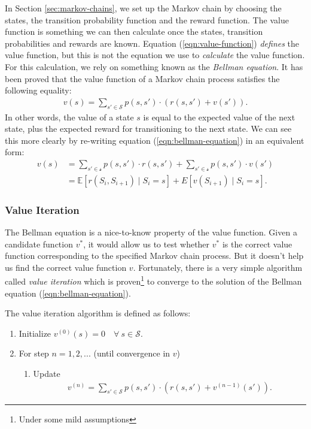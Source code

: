 \documentclass{article}
\begin{document}
      In Section \ref{sec:markov-chains}, we set up the Markov chain by choosing the states, the transition probability function and the reward function. The value function is something we can then calculate once the states, transition probabilities and rewards are known. Equation (\ref{eqn:value-function}) {\it defines} the value function, but this is not the equation we use to {\it calculate} the value function. For this calculation, we rely on something known as the {\it Bellman equation}. It has been proved that the value function of a Markov chain process satisfies the following equality:
      \begin{align}
        \label{eqn:bellman-equation}
        v(s) = \sum_{s' \in \mathcal S} p(s, s') \cdot (r(s, s') + v(s')).
      \end{align}
      In other words, the value of a state $s$ is equal to the expected value of the next state, plus the expected reward for transitioning to the next state. We can see this more clearly by re-writing equation (\ref{eqn:bellman-equation}) in an equivalent form:
      \begin{align*}
        v(s) &= \sum_{s' \in \mathcal s} p(s, s') \cdot r(s, s') + \sum_{s' \in \mathcal s} p(s, s') \cdot v(s')\\
        &= \mathbb E[r(S_i, S_{i+1}) \mid S_i = s] + E[v(S_{i+1}) \mid S_i = s].
      \end{align*}

    \subsubsection{\sc Value Iteration}

      The Bellman equation is a nice-to-know property of the value function. Given a candidate function $v^*$, it would allow us to test whether $v^*$ is the correct value function corresponding to the specified Markov chain process. But it doesn't help us find the correct value function $v$. Fortunately, there is a very simple algorithm called {\it value iteration} which is proven\footnote{Under some mild assumptions} to converge to the solution of the Bellman equation (\ref{eqn:bellman-equation}).

      The value iteration algorithm is defined as follows:
      \begin{enumerate}
        \item Initialize $v^{(0)}(s) = 0 \quad \forall~s\in\mathcal S$.
        \item For step $n = 1, 2, ...$ (until convergence in $v$)
        \begin{enumerate}
          \item Update
            \begin{align*}
              v^{(n)} = \sum_{s' \in \mathcal S} p(s, s') \cdot (r(s, s') + v^{(n-1)}(s')).
            \end{align*}
        \end{enumerate}
      \end{enumerate}
\end{document}
